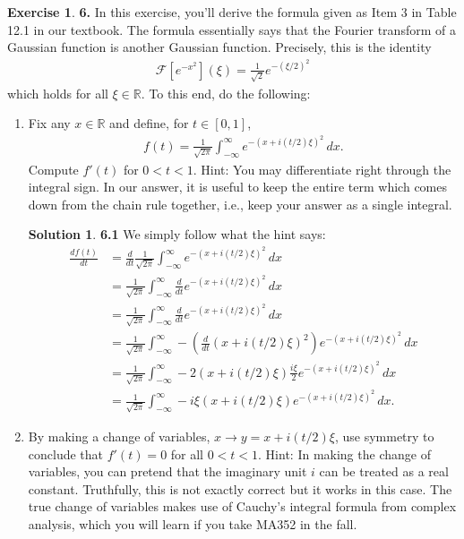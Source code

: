 \documentclass{book}
\theoremstyle{definition}
\newtheorem*{exer*}{Exercise}
\newtheorem*{sln*}{Solution}
\newcommand{\R}{\mathbb{R}}
\newcommand{\F}{\mathcal{F}}
\newcommand{\f}[2]{\frac{#1}{#2}}
\newcommand{\lp}{\left(}
\newcommand{\rp}{\right)}
\begin{document}
\begin{exer*}\textbf{6. }In this exercise, you'll derive the formula given as Item 3 in Table 12.1 in our textbook. The formula essentially says that the Fourier transform of a Gaussian function is another Gaussian function. Precisely, this is the identity
	\begin{align*}
	\F[e^{-x^2}](\xi) = \f{1}{\sqrt{2}}e^{-(\xi/2)^2}
	\end{align*}
	which holds for all $\xi \in \R$. To this end, do the following:
	
	\begin{enumerate}
		\item Fix any $x \in \R$ and define, for $t \in [0,1]$,
		\begin{align*}
		f(t) = \f{1}{\sqrt{2\pi}} \int^\infty_{-\infty} e^{-(x+ i(t/2)\xi)^2}\,dx.
		\end{align*}
		Compute $f'(t)$ for $0 < t < 1$. Hint: You may differentiate right through the integral sign. In our answer, it is useful to keep the entire term which comes down from the chain rule together, i.e., keep your answer as a single integral.
		
		\begin{sln*}\textbf{6.1}
			We simply follow what the hint says:
			\begin{align*}
			\f{df(t)}{dt} &= \f{d}{dt}\f{1}{\sqrt{2\pi}} \int^\infty_{-\infty} e^{-(x+ i(t/2)\xi)^2}\,dx\\
			&= \f{1}{\sqrt{2\pi}} \int^\infty_{-\infty} \f{d}{dt}e^{-(x+ i(t/2)\xi)^2}\,dx\\
			&= \f{1}{\sqrt{2\pi}} \int^\infty_{-\infty} \f{d}{dt}e^{-(x+ i(t/2)\xi)^2}\,dx\\
			&= \f{1}{\sqrt{2\pi}} \int^\infty_{-\infty} -\lp\f{d}{dt}(x + i(t/2)\xi)^2\rp e^{-(x + i(t/2)\xi)^2}\,dx\\
			&= \f{1}{\sqrt{2\pi}} \int^\infty_{-\infty}-2(x + i(t/2)\xi)\f{i\xi}{2} e^{-(x + i(t/2)\xi)^2}\,dx\\
			&= \f{1}{\sqrt{2\pi}} \int^\infty_{-\infty} -i\xi (x + i(t/2)\xi)e^{-(x + i(t/2)\xi)^2}\,dx.
			\end{align*}
		\end{sln*}
	
		\item By making a change of variables, $x \to y = x + i(t/2)\xi$, use symmetry to conclude that $f'(t) = 0$ for all $0 < t < 1$. Hint: In making the change of variables, you can pretend that the imaginary unit $i$ can be treated as a real constant. Truthfully, this is not exactly correct but it works in this case. The true change of variables makes use of Cauchy's integral formula from complex analysis, which you will learn if you take MA352 in the fall. 
		

\end{enumerate}
\end{exer*}
\end{document}
